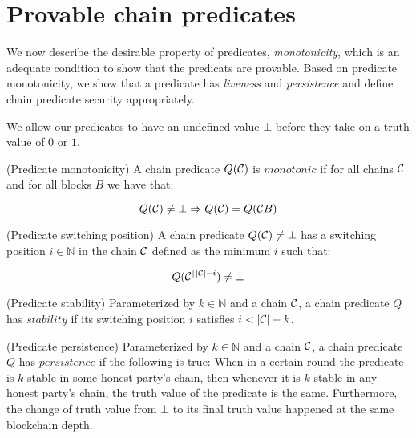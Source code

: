 \section{Provable chain predicates}

We now describe the desirable property of predicates, \textit{monotonicity},
which is an adequate condition to show that the predicats are provable. Based
on predicate monotonicity, we show that a predicate has \textit{liveness} and
\textit{persistence} and define chain predicate security appropriately.

We allow our predicates to have an undefined value $\bot$ before they take
on a truth value of $0$ or $1$.

\begin{definition}{(Predicate monotonicity)}
    A chain predicate $Q(\mathcal{C})$ is $\textit{monotonic}$ if for all chains
    $\mathcal{C}$ and for all blocks $B$ we have that:

    \begin{equation*}
        Q(\mathcal{C}) \neq \bot \Rightarrow Q(\mathcal{C}) = Q(\mathcal{C} B)
    \end{equation*}
\end{definition}

\begin{definition}{(Predicate switching position)}
    A chain predicate $Q(\mathcal{C}) \neq \bot$ has a switching position $i \in
    \mathbb{N}$ in the chain $\mathcal{C}$ defined as the minimum $i$ such that:

    \begin{equation*}
        Q(\mathcal{C}^{\lceil |\mathcal{C}| - i}) \neq \bot
    \end{equation*}
\end{definition}

\begin{definition}{(Predicate stability)}
    Parameterized by $k \in \mathbb{N}$ and a chain $\mathcal{C}$, a chain predicate
    $Q$ has $\textit{stability}$ if its switching position $i$ satisfies $i <
    |\mathcal{C}| - k$.
\end{definition}

\begin{definition}{(Predicate persistence)}
    Parameterized by $k \in \mathbb{N}$ and a chain $\mathcal{C}$, a chain predicate
    $Q$ has $\textit{persistence}$ if the following is true: When in a certain
    round the predicate is $k$-stable in some honest party's chain, then
    whenever it is $k$-stable in any honest party's chain, the truth value of
    the predicate is the same. Furthermore, the change of truth value from
    $\bot$ to its final truth value happened at the same blockchain depth.
\end{definition}

